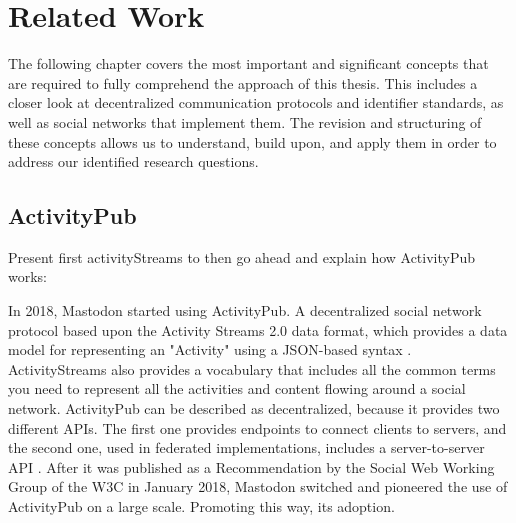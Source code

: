 \chapter{Related Work}
\label{cha:relatedwork}


The following chapter covers the most important and significant concepts that are required to fully comprehend the approach of this thesis. This includes a closer look at decentralized  communication protocols and identifier standards, as well as social networks that implement them. The revision and structuring of these concepts allows us to understand, build upon, and apply them in order to address our identified research questions. 

\section{ActivityPub}
Present first activityStreams to then go ahead and explain how ActivityPub works:

In 2018, Mastodon started using ActivityPub. A decentralized social network protocol based upon the Activity Streams 2.0 data format, which provides a data model for representing an "Activity" using a JSON-based syntax \cite{snell_prodromou_2017}. ActivityStreams also provides a vocabulary that includes all the common terms you need to represent all the activities and content flowing around a social network. ActivityPub can be described as decentralized, because it provides two different APIs. The first one provides endpoints to connect clients to servers, and the second one, used in federated implementations, includes a server-to-server API \cite{lemmer-webber_tallon_guy_prodromou_2018}. After it was published as a Recommendation by the Social Web Working Group of the W3C in January 2018, Mastodon switched and pioneered the use of ActivityPub on a large scale. Promoting this way, its adoption.


